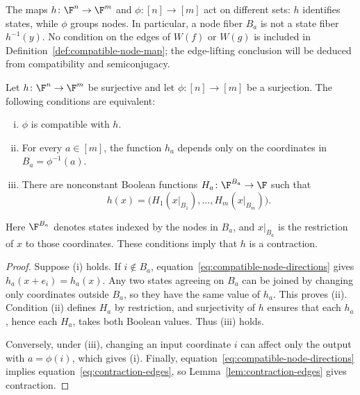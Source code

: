 The maps $h\colon\F^n\to\F^m$ and $\phi\colon[n]\to[m]$ act on different sets: $h$ identifies states, while $\phi$ groups nodes. In particular, a node fiber $B_a$ is not a state fiber $h^{-1}(y)$. No condition on the edges of $W(f)$ or $W(g)$ is included in Definition~\ref{def:compatible-node-map}; the edge-lifting conclusion will be deduced from compatibility and semiconjugacy.

\begin{samepage}
\begin{proposition}\label{prop:compatible-block-form}
    Let $h\colon\F^n\to\F^m$ be surjective and let $\phi\colon[n]\to[m]$ be a surjection. The following conditions are equivalent:
    \begin{enumerate}[(i)]
        \item $\phi$ is compatible with $h$.
        \item For every $a\in[m]$, the function $h_a$ depends only on the coordinates in $B_a=\phi^{-1}(a)$.
        \item There are nonconstant Boolean functions $H_a\colon\F^{B_a}\to\F$ such that
        \begin{equation}\label{eq:compatible-block-form}
            h(x)=\bigl(H_1(x|_{B_1}),\dots,H_m(x|_{B_m})\bigr).
        \end{equation}
    \end{enumerate}
    Here $\F^{B_a}$ denotes states indexed by the nodes in $B_a$, and $x|_{B_a}$ is the restriction of $x$ to those coordinates. These conditions imply that $h$ is a contraction.
\end{proposition}
\end{samepage}

\begin{proof}
    Suppose (i) holds. If $i\notin B_a$, equation~\eqref{eq:compatible-node-directions} gives $h_a(x+e_i)=h_a(x)$. Any two states agreeing on $B_a$ can be joined by changing only coordinates outside $B_a$, so they have the same value of $h_a$. This proves (ii). Condition (ii) defines $H_a$ by restriction, and surjectivity of $h$ ensures that each $h_a$, hence each $H_a$, takes both Boolean values. Thus (iii) holds.

    Conversely, under (iii), changing an input coordinate $i$ can affect only the output with $a=\phi(i)$, which gives (i). Finally, equation~\eqref{eq:compatible-node-directions} implies equation~\eqref{eq:contraction-edges}, so Lemma~\ref{lem:contraction-edges} gives contraction.
\end{proof}

